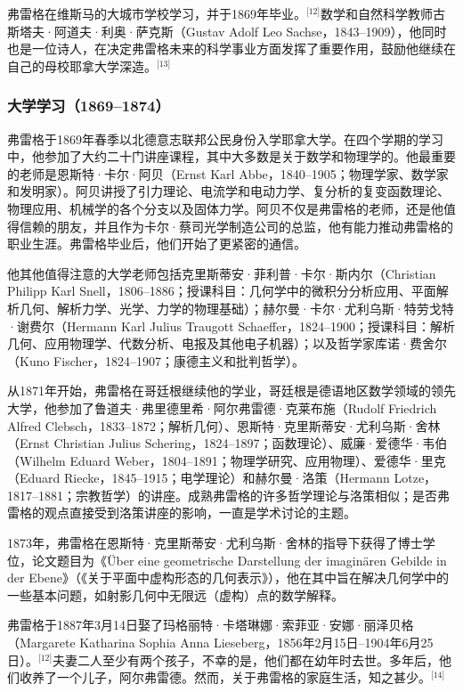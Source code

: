 弗雷格在维斯马的大城市学校学习，并于1869年毕业。\(^\text{[12]}\)数学和自然科学教师古斯塔夫·阿道夫·利奥·萨克斯（Gustav Adolf Leo Sachse，1843–1909），他同时也是一位诗人，在决定弗雷格未来的科学事业方面发挥了重要作用，鼓励他继续在自己的母校耶拿大学深造。\(^\text{[13]}\)
\subsubsection{大学学习（1869–1874）}  
弗雷格于1869年春季以北德意志联邦公民身份入学耶拿大学。在四个学期的学习中，他参加了大约二十门讲座课程，其中大多数是关于数学和物理学的。他最重要的老师是恩斯特·卡尔·阿贝（Ernst Karl Abbe，1840–1905；物理学家、数学家和发明家）。阿贝讲授了引力理论、电流学和电动力学、复分析的复变函数理论、物理应用、机械学的各个分支以及固体力学。阿贝不仅是弗雷格的老师，还是他值得信赖的朋友，并且作为卡尔·蔡司光学制造公司的总监，他有能力推动弗雷格的职业生涯。弗雷格毕业后，他们开始了更紧密的通信。

他其他值得注意的大学老师包括克里斯蒂安·菲利普·卡尔·斯内尔（Christian Philipp Karl Snell，1806–1886；授课科目：几何学中的微积分分析应用、平面解析几何、解析力学、光学、力学的物理基础）；赫尔曼·卡尔·尤利乌斯·特劳戈特·谢费尔（Hermann Karl Julius Traugott Schaeffer，1824–1900；授课科目：解析几何、应用物理学、代数分析、电报及其他电子机器）；以及哲学家库诺·费舍尔（Kuno Fischer，1824–1907；康德主义和批判哲学）。

从1871年开始，弗雷格在哥廷根继续他的学业，哥廷根是德语地区数学领域的领先大学，他参加了鲁道夫·弗里德里希·阿尔弗雷德·克莱布施（Rudolf Friedrich Alfred Clebsch，1833–1872；解析几何）、恩斯特·克里斯蒂安·尤利乌斯·舍林（Ernst Christian Julius Schering，1824–1897；函数理论）、威廉·爱德华·韦伯（Wilhelm Eduard Weber，1804–1891；物理学研究、应用物理）、爱德华·里克（Eduard Riecke，1845–1915；电学理论）和赫尔曼·洛策（Hermann Lotze，1817–1881；宗教哲学）的讲座。成熟弗雷格的许多哲学理论与洛策相似；是否弗雷格的观点直接受到洛策讲座的影响，一直是学术讨论的主题。

1873年，弗雷格在恩斯特·克里斯蒂安·尤利乌斯·舍林的指导下获得了博士学位，论文题目为《Über eine geometrische Darstellung der imaginären Gebilde in der Ebene》（《关于平面中虚构形态的几何表示》），他在其中旨在解决几何学中的一些基本问题，如射影几何中无限远（虚构）点的数学解释。

弗雷格于1887年3月14日娶了玛格丽特·卡塔琳娜·索菲亚·安娜·丽泽贝格（Margarete Katharina Sophia Anna Lieseberg，1856年2月15日–1904年6月25日）。\(^\text{[12]}\)夫妻二人至少有两个孩子，不幸的是，他们都在幼年时去世。多年后，他们收养了一个儿子，阿尔弗雷德。然而，关于弗雷格的家庭生活，知之甚少。\(^\text{[14]}\)
